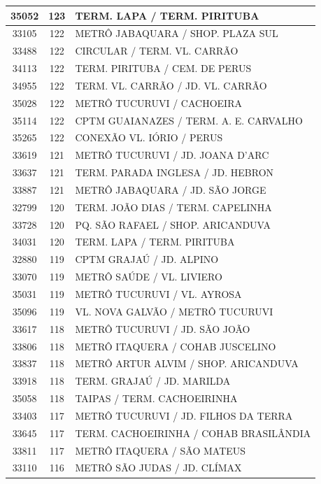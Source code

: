 \documentclass[
	12pt,				%
	oneside,			%
	a4paper,			%
	english,			%
	brazil				%
	]{abntex2ppgsi}
\begin{document}
{{\begin{apendicesenv}
\begin{longtable}{c|c|p{7cm}}
 \hline 
35052 &	123 &	TERM. LAPA / TERM. PIRITUBA \\ 
 \hline 
33105 &	122 &	METRÔ JABAQUARA / SHOP. PLAZA SUL \\ 
 \hline 
33488 &	122 &	CIRCULAR / TERM. VL. CARRÃO \\ 
 \hline 
34113 &	122 &	TERM. PIRITUBA / CEM. DE PERUS \\ 
 \hline 
34955 &	122 &	TERM. VL. CARRÃO / JD. VL. CARRÃO \\ 
 \hline 
35028 &	122 &	METRÔ TUCURUVI / CACHOEIRA \\ 
 \hline 
35114 &	122 &	CPTM GUAIANAZES / TERM. A. E. CARVALHO \\ 
 \hline 
35265 &	122 &	CONEXÃO VL. IÓRIO / PERUS \\ 
 \hline 
33619 &	121 &	METRÔ TUCURUVI / JD. JOANA D'ARC \\ 
 \hline 
33637 &	121 &	TERM. PARADA INGLESA / JD. HEBRON \\ 
 \hline 
33887 &	121 &	METRÔ JABAQUARA / JD. SÃO JORGE \\ 
 \hline 
32799 &	120 &	TERM. JOÃO DIAS / TERM. CAPELINHA \\ 
 \hline 
33728 &	120 &	PQ. SÃO RAFAEL / SHOP. ARICANDUVA \\ 
 \hline 
34031 &	120 &	TERM. LAPA / TERM. PIRITUBA \\ 
 \hline 
32880 &	119 &	CPTM GRAJAÚ / JD. ALPINO \\ 
 \hline 
33070 &	119 &	METRÔ SAÚDE / VL. LIVIERO \\ 
 \hline 
35031 &	119 &	METRÔ TUCURUVI / VL. AYROSA \\ 
 \hline 
35096 &	119 &	VL. NOVA GALVÃO / METRÔ TUCURUVI \\ 
 \hline 
33617 &	118 &	METRÔ TUCURUVI / JD. SÃO JOÃO \\ 
 \hline 
33806 &	118 &	METRÔ ITAQUERA / COHAB JUSCELINO \\ 
 \hline 
33837 &	118 &	METRÔ ARTUR ALVIM / SHOP. ARICANDUVA \\ 
 \hline 
33918 &	118 &	TERM. GRAJAÚ / JD. MARILDA \\ 
 \hline 
35058 &	118 &	TAIPAS / TERM. CACHOEIRINHA \\ 
 \hline 
33403 &	117 &	METRÔ TUCURUVI / JD. FILHOS DA TERRA \\ 
 \hline 
33645 &	117 &	TERM. CACHOEIRINHA / COHAB BRASILÂNDIA \\ 
 \hline 
33811 &	117 &	METRÔ ITAQUERA / SÃO MATEUS \\ 
 \hline 
33110 &	116 &	METRÔ SÃO JUDAS / JD. CLÍMAX \\ 

\end{longtable}
\end{apendicesenv}}}
\end{document}
